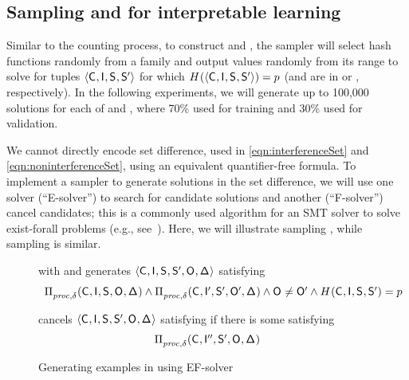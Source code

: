 \subsection{Sampling \noninterferenceSetSamples and
\interferenceSetSamples for interpretable learning} 
\label{dinome:sec:impl:sampler}
Similar to the counting process, to construct
\noninterferenceSetSamples and \interferenceSetSamples, the sampler
will select hash functions \hashPrefixFn{} randomly from a family and
output values \hashFnOutputPrefix randomly from its range to solve for
tuples $\langle \mathsf{C}_{},\mathsf{I}_{},\mathsf{S}_{},\mathsf{S}'_{} \rangle$ for
which $H^{}(\langle \mathsf{C}_{},\mathsf{I}_{},\mathsf{S}_{},\mathsf{S}'_{}
\rangle) = p$ (and are in \noninterferenceSet or
\interferenceSet, respectively).  In the following experiments, we
will generate up to 100,000 solutions for each of
\noninterferenceSetSamples and \interferenceSetSamples, where 70\%
used for training and 30\% used for validation.

We cannot directly encode set difference, used in
\eqref{eqn:interferenceSet} and \eqref{eqn:noninterferenceSet}, using
an equivalent quantifier-free formula. To implement a sampler to
generate solutions in the set difference, we will use one solver
(``E-solver'') to search for candidate solutions and another
(``F-solver'') cancel candidates; this is a commonly used algorithm
for an SMT solver to solve exist-forall problems (e.g.,
see~\cite{dutertre2015solving}).  Here, we will illustrate sampling
\interferenceSet, while sampling \noninterferenceSet is similar.

\begin{figure}[tb]
\noindent
\interferenceSuperTest with \hashPrefixFn{} and \hashFnOutputPrefix{}
generates
$\langle\mathsf{C}_{},\mathsf{I}_{},\mathsf{S}_{},\mathsf{S}'_{},\mathsf{O}_{},\mathsf{\Delta}_{}\rangle$
satisfying
\begin{align}
\begin{array}[m]{rr}
\postcondition{\proc,\declassify{}}{}(\ACIFn{}, \AIIFn{}, \SecFn{},
\AOOFn{}, \DCFn{})
\wedge
\postcondition{\proc,\declassify{}}{}(\ACIFn{}, \AIIFnAlt{},
\SecFnAlt{}, \AOOFnAlt{}, \DCFn{})
\wedge  \AOOFn{} \neq \AOOFnAlt{} \wedge
\hashPrefixFn{}(\ACIFn{},\AIIFn{},\SecFn{},\SecFnAlt{})=\hashFnOutputPrefix
\end{array}
\label{eqn:interferenceSuperTest} 
\end{align}

\noindent
\interferenceFalseTest{} cancels
$\langle\mathsf{C}_{},\mathsf{I}_{},\mathsf{S}_{},\mathsf{S}'_{},\mathsf{O}_{},\mathsf{\Delta}_{}\rangle$
satisfying  if there is some
\AIIFnAltAlt{} satisfying
\begin{align}
\begin{array}[m]{rr}
\postcondition{\proc,\declassify{}}{}(\ACIFn{}, \AIIFnAltAlt{},
\SecFnAlt{}, \AOOFn{}, \DCFn{})
\end{array}
\label{eqn:interferenceFalseTest}
\end{align}
\caption{Generating examples in \interferenceSetSamples using
EF-solver\label{fig:ef-solver}}
\end{figure}

